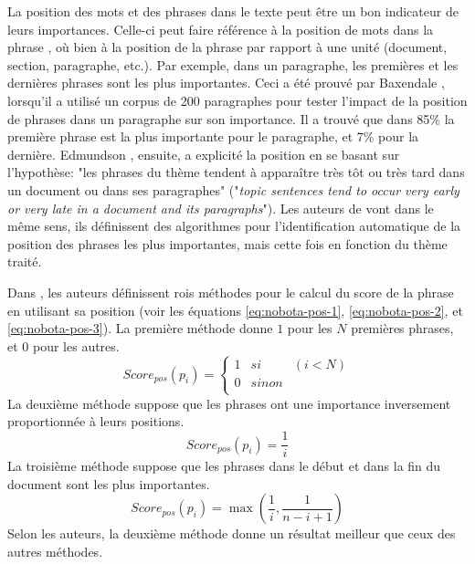 \documentclass[a4paper,12pt,oneside]{../use/ESIthesis}
\begin{document}
La position des mots et des phrases dans le texte peut être un bon indicateur de leurs importances. 
Celle-ci peut faire référence à la position de mots dans la phrase \cite{58-luhn}, où bien à la position de la phrase par rapport à une unité (document, section, paragraphe, etc.)\cite{58-baxendale,69-edmundson,97-lin-hovy,04-nobata-sekine}.
Par exemple, dans un paragraphe, les premières et les dernières phrases sont les plus importantes.
Ceci a été prouvé par Baxendale \cite{58-baxendale}, lorsqu'il a utilisé un corpus de 200 paragraphes pour tester l'impact de la position de phrases dans un paragraphe sur son importance. 
Il a trouvé que dans 85\% la première phrase est la plus importante pour le paragraphe, et 7\% pour la dernière. 
Edmundson \cite{69-edmundson}, ensuite, a explicité la position en se basant sur l'hypothèse: "les phrases du thème tendent à apparaître très tôt ou très tard dans un document ou dans ses paragraphes" ("\textit{topic sentences tend to occur very early or very late in a document and its paragraphs}").
Les auteurs de \cite{97-lin-hovy} vont dans le même sens, ils définissent des algorithmes pour l'identification automatique de la position des phrases les plus importantes, mais cette fois en fonction du thème traité.

Dans \cite{04-nobata-sekine}, les auteurs définissent rois méthodes pour le calcul du score de la phrase en utilisant sa position (voir les équations \ref{eq:nobota-pos-1}, \ref{eq:nobota-pos-2}, et \ref{eq:nobota-pos-3}).
La première méthode donne $ 1 $ pour les $ N $ premières phrases, et $ 0 $ pour les autres. 
\begin{equation}
\label{eq:nobota-pos-1}
Score_{pos}(p_i) = \left\lbrace 
\begin{array}{lll}
1 & si & (i<N) \\
0 & sinon & \\
\end{array}
\right. 
\end{equation}
La deuxième méthode suppose que les phrases ont une importance inversement proportionnée à leurs positions. 
\begin{equation}
\label{eq:nobota-pos-2}
Score_{pos}(p_i) = \frac{1}{i}
\end{equation}
La troisième méthode suppose que les phrases dans le début et dans la fin du document sont les plus importantes.
\begin{equation}
\label{eq:nobota-pos-3}
Score_{pos}(p_i) = \max(\frac{1}{i}, \frac{1}{n-i+1})
\end{equation}
Selon les auteurs, la deuxième méthode donne un résultat meilleur que ceux des autres méthodes.
\end{document}
